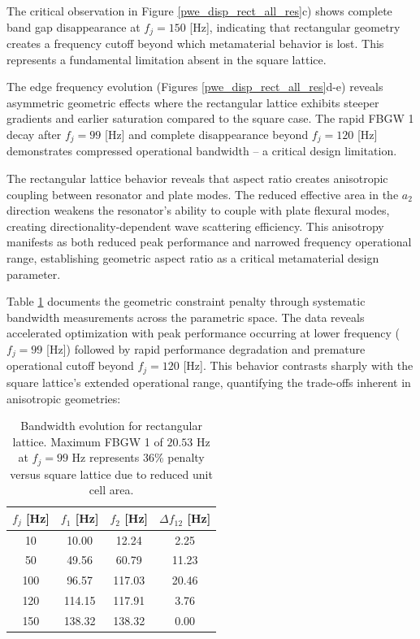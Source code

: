 \documentclass[review,numbers,sort&compress]{elsarticle}
\begin{document}
The critical observation in Figure \ref{pwe_disp_rect_all_res}c) shows complete band gap disappearance at $f_j = 150$ [Hz], indicating that rectangular geometry creates a frequency cutoff beyond which metamaterial behavior is lost. This represents a fundamental limitation absent in the square lattice.

The edge frequency evolution (Figures \ref{pwe_disp_rect_all_res}d-e) reveals asymmetric geometric effects where the rectangular lattice exhibits steeper gradients and earlier saturation compared to the square case. The rapid FBGW 1 decay after $f_j = 99$ [Hz] and complete disappearance beyond $f_j = 120$ [Hz] demonstrates compressed operational bandwidth – a critical design limitation.

The rectangular lattice behavior reveals that aspect ratio creates anisotropic coupling between resonator and plate modes. The reduced effective area in the $a_2$ direction weakens the resonator's ability to couple with plate flexural modes, creating directionality-dependent wave scattering efficiency. This anisotropy manifests as both reduced peak performance and narrowed frequency operational range, establishing geometric aspect ratio as a critical metamaterial design parameter.

Table \ref{tab_rect_latice_fbgw} documents the geometric constraint penalty through systematic bandwidth measurements across the parametric space. The data reveals accelerated optimization with peak performance occurring at lower frequency ($f_j = 99$ [Hz]) followed by rapid performance degradation and premature operational cutoff beyond $f_j = 120$ [Hz]. This behavior contrasts sharply with the square lattice's extended operational range, quantifying the trade-offs inherent in anisotropic geometries:
\newpage
\begin{table}[htb]
    \centering
    \caption{Bandwidth evolution for rectangular lattice. Maximum FBGW 1 of $20.53$ Hz at $f_j = 99$ Hz represents 36\% penalty versus square lattice due to reduced unit cell area.}
    \label{tab_rect_latice_fbgw}
    \begin{tabular}{cccc}
        \hline
        $f_j$ [Hz] & $f_1$ [Hz] & $f_2$ [Hz] & $\Delta f_{12}$ [Hz] \\
        \hline
        10  & 10.00  & 12.24  & 2.25 \\
        50  & 49.56  & 60.79  & 11.23 \\
        100 & 96.57  & 117.03 & 20.46 \\
        120 & 114.15 & 117.91 & 3.76 \\
        150 & 138.32 & 138.32 & 0.00 \\
        \hline
    \end{tabular}
\end{table}
\end{document}
